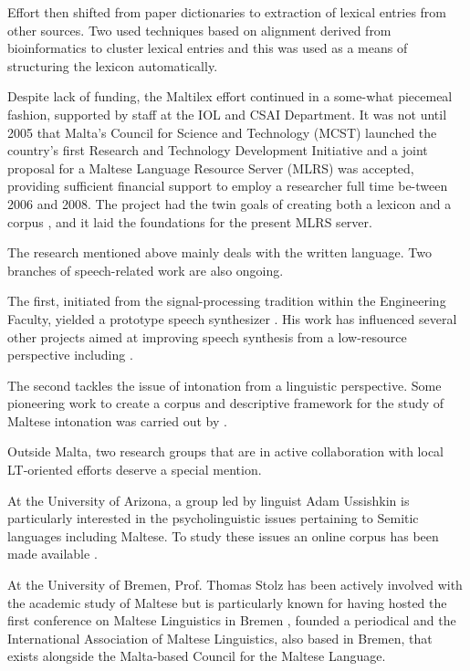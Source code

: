 \documentclass[]{../../metanetpaper}
\begin{document}
\begin{multicols}{2}
Effort then shifted from paper dictionaries to extraction of lexical entries from other sources. Two \cite{Dalli:2001, Attard:2006} %
used techniques based on alignment derived from bioinformatics to cluster lexical entries and this was used as a means of structuring the lexicon automatically. 

Despite lack of funding, the Maltilex effort continued in a some-what piecemeal fashion, supported by staff at the IOL and CSAI Department. It was not until 2005 that Malta's Council for Science and Technology (MCST) launched the country's first Research and Technology Development Initiative and a joint proposal for a Maltese Language Resource Server (MLRS) was accepted, providing sufficient financial support to employ a researcher full time be-tween 2006 and 2008. The project had the twin goals of creating both a lexicon and a corpus \cite{Rosner:2009}, and it laid the foundations for the present MLRS server.

The research mentioned above mainly deals with the written language. Two branches of speech-related work are also ongoing. 

The first, initiated from the signal-processing tradition within the Engineering Faculty, yielded a prototype speech synthesizer \cite{Micallef:1997}. His work has influenced several other projects aimed at improving speech synthesis from a low-resource perspective including \cite{Calleja:2002, Farrugia:2005, Camilleri:2010, Borg-et-al:2011}.

The second tackles the issue of intonation \cite{Vella:2009} from a linguistic perspective. Some pioneering work to create a corpus and descriptive framework for the study of Maltese intonation was carried out by \cite{Vella-Farrugia:2006}. 

Outside Malta, two research groups that are in active collaboration with local LT-oriented efforts deserve a special mention.

At the University of Arizona, a group led by linguist Adam Ussishkin is particularly interested in the psycholinguistic issues pertaining to Semitic languages including Maltese. To study these issues an online corpus has been made available \cite{Ussishkin-et-al:2009}. 

At the University of Bremen, Prof. Thomas Stolz has been actively involved with the academic study of Maltese but is particularly known for having hosted the first conference on Maltese Linguistics in Bremen \cite{Comrie-et-al:2009}, founded a periodical \cite{GHILM2} and the International Association of Maltese Linguistics, also based in Bremen, that exists alongside the Malta-based Council for the Maltese Language.


\end{multicols}
\end{document}
